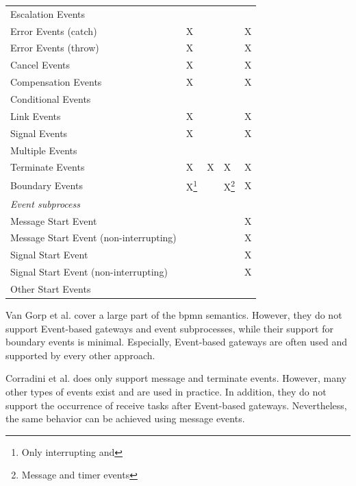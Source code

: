 \documentclass[adraft, copyright, creativecommons]{eptcs} %
\begin{document}
\begin{table}[htbp]
\begin{tabular}{l l l l l}
      Escalation Events & & & & \\
      Error Events (catch) & X & & & \color{yellow}X\\ %
      Error Events (throw) & X & & & \color{yellow}X\\
      Cancel Events & X & & & \color{yellow}X\\
      Compensation Events & X & & & \color{yellow}X\\
      Conditional Events & & & &\\
      Link Events & X & & & X\\
      Signal Events & X & & & X\\
      Multiple Events &  & & & \\
      Terminate Events & X & X & X & X\\
     Boundary Events & X\footnote{Only interrupting and } & & X\footnote{Message and timer events} & X\\ %
      \textit{Event subprocess} &  &  &  & \\
      Message Start Event &  & & & X\\
      Message Start Event (non-interrupting) & & & & X\\
      Signal Start Event &  & & & X\\
      Signal Start Event (non-interrupting) &  & & & X\\
      Other Start Events &  & & & \\ %
    \end{tabular}
\end{table}

Van Gorp et al. \cite{vangorpVisualTokenbasedFormalization2013} cover a large part of the \gls*{bpmn} semantics.
However, they do not support Event-based gateways and event subprocesses, while their support for boundary events is minimal.
Especially, Event-based gateways are often used and supported by every other approach.

Corradini et al. \cite{corradiniFormalApproachAnalysis2021} does only support message and terminate events.
However, many other types of events exist and are used in practice.
In addition, they do not support the occurrence of receive tasks after Event-based gateways.
Nevertheless, the same behavior can be achieved using message events.
\end{document}
